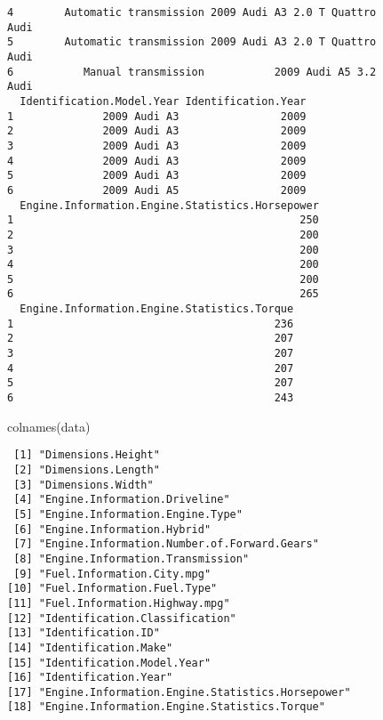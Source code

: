 \documentclass[
  letterpaper,
  DIV=11,
  numbers=noendperiod]{scrartcl}
\newenvironment{Shaded}{\begin{snugshade}}{\end{snugshade}}
\newcommand{\FunctionTok}[1]{\textcolor[rgb]{0.28,0.35,0.67}{#1}}
\newcommand{\NormalTok}[1]{\textcolor[rgb]{0.00,0.23,0.31}{#1}}
\begin{document}
\begin{verbatim}
4        Automatic transmission 2009 Audi A3 2.0 T Quattro                Audi
5        Automatic transmission 2009 Audi A3 2.0 T Quattro                Audi
6           Manual transmission           2009 Audi A5 3.2                Audi
  Identification.Model.Year Identification.Year
1              2009 Audi A3                2009
2              2009 Audi A3                2009
3              2009 Audi A3                2009
4              2009 Audi A3                2009
5              2009 Audi A3                2009
6              2009 Audi A5                2009
  Engine.Information.Engine.Statistics.Horsepower
1                                             250
2                                             200
3                                             200
4                                             200
5                                             200
6                                             265
  Engine.Information.Engine.Statistics.Torque
1                                         236
2                                         207
3                                         207
4                                         207
5                                         207
6                                         243
\end{verbatim}

\begin{Shaded}
\begin{Highlighting}[]
\FunctionTok{colnames}\NormalTok{(data)}
\end{Highlighting}
\end{Shaded}

\begin{verbatim}
 [1] "Dimensions.Height"                              
 [2] "Dimensions.Length"                              
 [3] "Dimensions.Width"                               
 [4] "Engine.Information.Driveline"                   
 [5] "Engine.Information.Engine.Type"                 
 [6] "Engine.Information.Hybrid"                      
 [7] "Engine.Information.Number.of.Forward.Gears"     
 [8] "Engine.Information.Transmission"                
 [9] "Fuel.Information.City.mpg"                      
[10] "Fuel.Information.Fuel.Type"                     
[11] "Fuel.Information.Highway.mpg"                   
[12] "Identification.Classification"                  
[13] "Identification.ID"                              
[14] "Identification.Make"                            
[15] "Identification.Model.Year"                      
[16] "Identification.Year"                            
[17] "Engine.Information.Engine.Statistics.Horsepower"
[18] "Engine.Information.Engine.Statistics.Torque"    
\end{verbatim}
\end{document}
